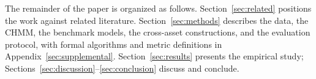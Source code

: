 The remainder of the paper is organized as follows.
Section~\ref{sec:related} positions the work against related literature.
Section~\ref{sec:methods} describes the data, the CHMM, the benchmark models, the cross-asset constructions, and the evaluation protocol, with formal algorithms and metric definitions in Appendix~\ref{sec:supplemental}.
Section~\ref{sec:results} presents the empirical study; Sections~\ref{sec:discussion}--\ref{sec:conclusion} discuss and conclude.
